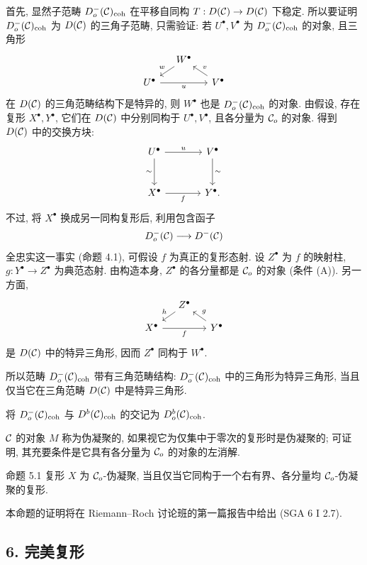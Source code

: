 首先, 显然子范畴 $D_o^-(\mathcal C)_{\mathrm{coh}}$ 在平移自同构 $T:D(\mathcal C)\to D(\mathcal C)$ 下稳定. 所以要证明 $D_o^-(\mathcal C)_{\mathrm{coh}}$ 为 $D(\mathcal C)$ 的三角子范畴, 只需验证: 若 $U^\bullet,V^\bullet$ 为 $D_o^-(\mathcal C)_{\mathrm{coh}}$ 的对象, 且三角形
\[
\begin{tikzcd}[column sep=small,row sep=small]
& W^\bullet \arrow[dl,"w"']\\
U^\bullet \arrow[rr,"u"']&& V^\bullet \arrow[ul,"v"']
\end{tikzcd}
\]
在 $D(\mathcal C)$ 的三角范畴结构下是特异的, 则 $W^\bullet$ 也是 $D_o^-(\mathcal C)_{\mathrm{coh}}$ 的对象. 由假设, 存在复形 $X^\bullet,Y^\bullet$, 它们在 $D(\mathcal C)$ 中分别同构于 $U^\bullet,V^\bullet$, 且各分量为 $\mathcal C_o$ 的对象. 得到 $D(\mathcal C)$ 中的交换方块:
\[
\begin{tikzcd}[column sep=large,row sep=large]
U^\bullet \arrow[r,"u"] \arrow[d,"\sim"']&V^\bullet \arrow[d,"\sim"]\\
X^\bullet \arrow[r,"f"']&Y^\bullet .
\end{tikzcd}
\]
不过, 将 $X^\bullet$ 换成另一同构复形后, 利用包含函子
\[
D_o^-(\mathcal C)\longrightarrow D^-(\mathcal C)
\]
全忠实这一事实 (命题 4.1), 可假设 $f$ 为真正的复形态射. 设 $Z^\bullet$ 为 $f$ 的映射柱, $g:Y^\bullet\to Z^\bullet$ 为典范态射. 由构造本身, $Z^\bullet$ 的各分量都是 $\mathcal C_o$ 的对象 (条件 (A)). 另一方面,
\[
\begin{tikzcd}[column sep=small,row sep=small]
&Z^\bullet \arrow[dl,"h"']\\
X^\bullet \arrow[rr,"f"']&&Y^\bullet \arrow[ul,"g"']
\end{tikzcd}
\]
是 $D(\mathcal C)$ 中的特异三角形, 因而 $Z^\bullet$ 同构于 $W^\bullet$.

所以范畴 $D_o^-(\mathcal C)_{\mathrm{coh}}$ 带有三角范畴结构: $D_o^-(\mathcal C)_{\mathrm{coh}}$ 中的三角形为特异三角形, 当且仅当它在三角范畴 $D(\mathcal C)$ 中是特异三角形.

将 $D_o^-(\mathcal C)_{\mathrm{coh}}$ 与 $D^b(\mathcal C)_{\mathrm{coh}}$ 的交记为 $D_o^b(\mathcal C)_{\mathrm{coh}}$.

$\mathcal C$ 的对象 $M$ 称为伪凝聚的, 如果视它为仅集中于零次的复形时是伪凝聚的; 可证明, 其充要条件是它具有各分量为 $\mathcal C_o$ 的对象的左消解.

\begin{statement}{命题 5.1}
复形 $X$ 为 $\mathcal C_o$-伪凝聚, 当且仅当它同构于一个右有界、各分量均 $\mathcal C_o$-伪凝聚的复形.
\end{statement}

本命题的证明将在 Riemann--Roch 讨论班的第一篇报告中给出 (SGA 6 I 2.7).

\subsection*{6. 完美复形}

